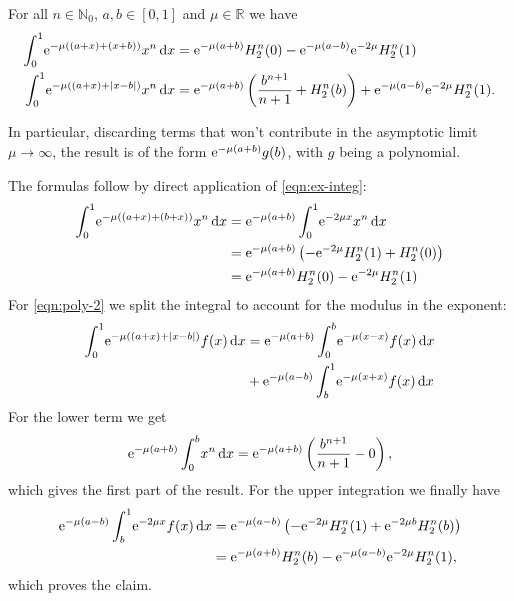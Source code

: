 \begin{Lemma}
  \label{lem:asymp-1}
  For all $n\in\mathbb{N}_0$, $a,b\in[0,1]$ and $\mu\in\mathbb{R}$ we
  have
  \begin{align}
    \label{eqn:poly-1}
    \Int{x}{\Eto{-\mu((a + x) + (x + b))} x^n} &= \Eto{-\mu(a+b)}H_2^n(0) -
    \Eto{-\mu(a-b)}\Eto{-2\mu}H^n_2(1) \\
    \label{eqn:poly-2}
    \Int{x}{\Eto{-\mu((a + x) + \Abs{x - b})}x^n} &=
    \Eto{-\mu(a+b)}\left(\frac{b^{n+1}}{n+1} + H_2^n(b)\right) +
    \Eto{-\mu(a-b)}\Eto{-2\mu}H^n_2(1).
  \end{align}
  \begin{Remark}
    In particular, discarding terms that won't contribute in the asymptotic limit
    $\mu\to\infty$, the result is of the form $\Eto{-\mu(a+b)}g(b)$, with $g$
    being a polynomial.
  \end{Remark}
  \begin{Proof}
    The formulas follow by direct application of \eqref{eqn:ex-integ}:
    \begin{align*}
      \Int{x}{\Eto{-\mu((a+x)+(b+x))}x^n} &= \Eto{-\mu(a+b)}\Int{x}{\Eto{-2\mu x}x^n} \\
        &= \Eto{-\mu(a+b)}\left(-\Eto{-2\mu}H^n_2(1) + H^n_2(0)\right) \\
        &= \Eto{-\mu(a+b)} H^n_2(0) - \Eto{-2\mu} H^n_2(1)
    \end{align*}
    For \eqref{eqn:poly-2} we split the integral to account for the modulus in
    the exponent:
    \begin{align*}
      \Int{x}{\Eto{-\mu( (a+x) + \Abs{x - b})}f(x)} &=
      \Eto{-\mu(a+b)}\Integ[b]{0}{x}{\Eto{-\mu(x-x)}f(x)} \\ &+
      \Eto{-\mu(a-b)}\Integ[1]{b}{x}{\Eto{-\mu(x+x)}f(x)}
    \end{align*}
    For the lower term we get
    \begin{equation*}
      \Eto{-\mu(a+b)}\Integ[b]{0}{x}{x^n} =
      \Eto{-\mu(a+b)}\left(\frac{b^{n+1}}{n+1} - 0\right),
    \end{equation*}
    which gives the first part of the result. For the upper integration we
    finally have
    \begin{align*}
      \Eto{-\mu(a-b)}\Integ[1]{b}{x}{\Eto{-2\mu x}f(x)} &=
      \Eto{-\mu(a-b)}\left(-\Eto{-2\mu}H^n_2(1) + \Eto{-2\mu b}H^n_2(b)\right) \\
      &= \Eto{-\mu(a+b)}H^n_2(b) - \Eto{-\mu(a-b)}\Eto{-2\mu}H^n_2(1),
    \end{align*}
    which proves the claim.
  \end{Proof}
\end{Lemma}
